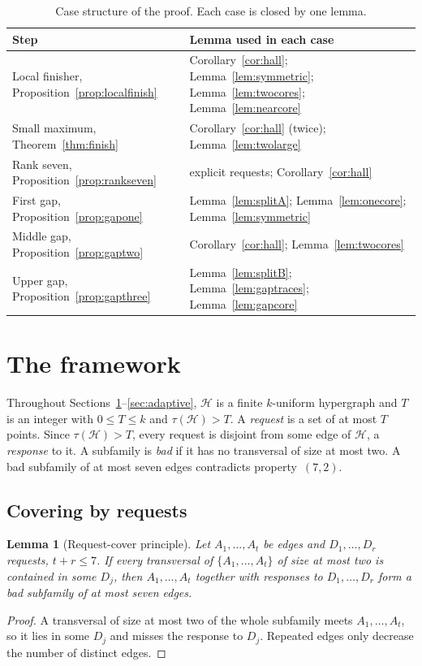 \documentclass[11pt]{article}
\numberwithin{equation}{section}
\newtheorem{lemma}[theorem]{Lemma}
\theoremstyle{definition}
\theoremstyle{remark}
\newcommand{\HH}{\mathcal H}
\begin{document}
\begin{table}[ht]
\centering\small
\begin{tabular}{>{\raggedright\arraybackslash}p{}>{\raggedright\arraybackslash}p{}}
\toprule
Step & Lemma used in each case\\
\midrule
Local finisher, Proposition~\ref{prop:localfinish}
 & Corollary~\ref{cor:hall}; Lemma~\ref{lem:symmetric}; Lemma~\ref{lem:twocores}; Lemma~\ref{lem:nearcore}\\
Small maximum, Theorem~\ref{thm:finish}
 & Corollary~\ref{cor:hall} (twice); Lemma~\ref{lem:twolarge}\\
Rank seven, Proposition~\ref{prop:rankseven}
 & explicit requests; Corollary~\ref{cor:hall}\\
First gap, Proposition~\ref{prop:gapone}
 & Lemma~\ref{lem:splitA}; Lemma~\ref{lem:onecore}; Lemma~\ref{lem:symmetric}\\
Middle gap, Proposition~\ref{prop:gaptwo}
 & Corollary~\ref{cor:hall}; Lemma~\ref{lem:twocores}\\
Upper gap, Proposition~\ref{prop:gapthree}
 & Lemma~\ref{lem:splitB}; Lemma~\ref{lem:gaptraces}; Lemma~\ref{lem:gapcore}\\
\bottomrule
\end{tabular}
\caption{Case structure of the proof. Each case is closed by one lemma.}
\label{tab:dependencies}
\end{table}

\section{The framework}\label{sec:framework}

Throughout Sections~\ref{sec:framework}--\ref{sec:adaptive}, $\HH$ is a
finite $k$-uniform hypergraph and $T$ is an integer with $0\le T\le k$
and $\tau(\HH)>T$. A \emph{request} is a set of at most $T$ points. Since
$\tau(\HH)>T$, every request is disjoint from some edge of $\HH$, a
\emph{response} to it. A subfamily is \emph{bad} if it has no
transversal of size at most two. A bad subfamily of at most seven edges
contradicts property~$(7,2)$.

\subsection{Covering by requests}
\begin{lemma}[Request-cover principle]\label{lem:requestcover}
Let $A_1,\dots,A_t$ be edges and $D_1,\dots,D_r$ requests, $t+r\le7$.
If every transversal of $\{A_1,\dots,A_t\}$ of size at most two is
contained in some $D_j$, then $A_1,\dots,A_t$ together with responses
to $D_1,\dots,D_r$ form a bad subfamily of at most seven edges.
\end{lemma}
\begin{proof}
A transversal of size at most two of the whole subfamily meets
$A_1,\dots,A_t$, so it lies in some $D_j$ and misses the response to
$D_j$. Repeated edges only decrease the number of distinct edges.
\end{proof}
\end{document}
